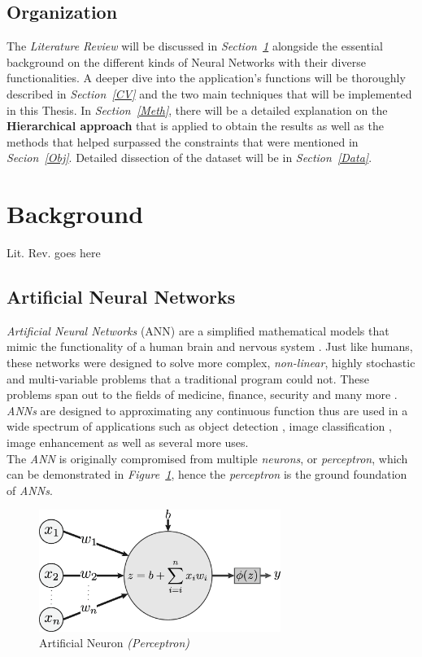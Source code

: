 \documentclass[12pt]{extarticle}
\begin{document}
	\subsection{Organization}\label{Org}
	The \emph{Literature Review} will be discussed in \emph{Section~\ref{Lit. Rev.}} alongside the essential background on the different kinds of Neural Networks with their diverse functionalities. A deeper dive into the application's functions will be thoroughly described in \emph{Section~\ref{CV}} and the two main techniques that will be implemented in this Thesis. In \emph{Section~\ref{Meth}}, there will be a detailed explanation on the \textbf{Hierarchical approach} that is applied to obtain the results as well as the methods that helped surpassed the constraints that were mentioned in \emph{Secion~\ref{Obj}}. Detailed dissection of the dataset will be in \emph{Section~\ref{Data}}.
	\newpage
	\section{Background}\label{Lit. Rev.}
	Lit. Rev. goes here
	\subsection{Artificial Neural Networks}\label{ANN}
	\emph{Artificial Neural Networks} (ANN) are a simplified mathematical models that mimic the functionality of a human brain and nervous system \cite{ANN, ANN2}. Just like humans, these networks were designed to solve more complex, \emph{non-linear}, highly stochastic and multi-variable problems that a traditional program could not. These problems span out to the fields of medicine, finance, security and many more \cite{ANN_funct}. \emph{ANNs} are designed to approximating any continuous function thus are used in a wide spectrum of applications such as object detection \cite{Objdet, Objdet2}, image classification \cite{classification}, image enhancement \cite{enhancement} as well as several more uses.\\[5mm]
	The \emph{ANN} is originally compromised from multiple \emph{neurons}, or \emph{perceptron}, which can be demonstrated in \emph{Figure~\ref{fig:Perceptron}}, hence the \emph{perceptron} is the ground foundation of \emph{ANNs}.
	\begin{figure}[h]
		\centering
		\includegraphics[width=0.7\textwidth]{pics/Figures/Perceptron.eps}
		\caption{\small{Artificial Neuron \emph{(Perceptron)}}}
		\label{fig:Perceptron}
	\end{figure}
	
\end{document}
